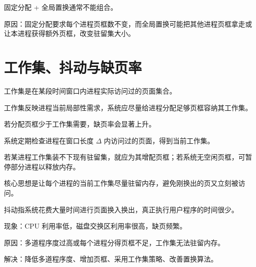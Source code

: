 \begin{points}
  \item 固定分配 + 全局置换通常不能组合。
  \item 原因：固定分配要求每个进程页框数不变，而全局置换可能把其他进程页框拿走或让本进程获得额外页框，改变驻留集大小。
\end{points}


\section{工作集、抖动与缺页率}
\begin{points}
  \item 工作集是在某段时间窗口内进程实际访问过的页面集合。
  \item 工作集反映进程当前局部性需求，系统应尽量给进程分配足够页框容纳其工作集。
  \item 若分配页框少于工作集需要，缺页率会显著上升。
\end{points}


\begin{points}
  \item 系统定期检查进程在窗口长度 $\Delta$ 内访问过的页面，得到当前工作集。
  \item 若某进程工作集装不下现有驻留集，就应为其增配页框；若系统无空闲页框，可暂停部分进程以释放内存。
  \item 核心思想是让每个进程的当前工作集尽量驻留内存，避免刚换出的页又立刻被访问。
\end{points}


\begin{points}
  \item 抖动指系统花费大量时间进行页面换入换出，真正执行用户程序的时间很少。
  \item 现象：CPU 利用率低，磁盘交换区利用率很高，缺页频繁。
  \item 原因：多道程序度过高或每个进程分得页框不足，工作集无法驻留内存。
  \item 解决：降低多道程序度、增加页框、采用工作集策略、改善置换算法。
\end{points}


